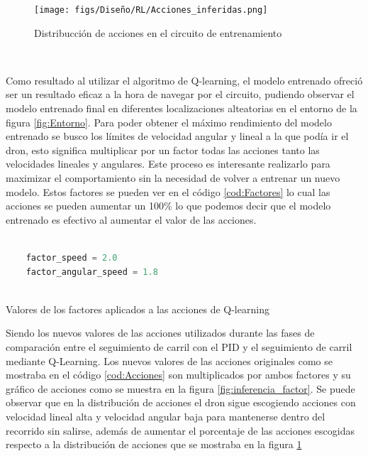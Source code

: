 \begin{figure} [H]
  \begin{center}
    \texttt{[image: figs/Diseño/RL/Acciones\_inferidas.png]}
  \end{center}
  \caption{Distribucción de acciones en el circuito de entrenamiento}
  \label{fig:Distribucción_inferencia}
\end{figure}\

Como resultado al utilizar el algoritmo de Q-learning, el modelo entrenado ofreció ser un resultado eficaz a la hora de navegar por el circuito, pudiendo observar 
el modelo entrenado final en diferentes localizaciones alteatorias en el entorno de la figura \ref{fig:Entorno}. Para poder obtener el máximo rendimiento del modelo entrenado se busco los límites de velocidad
angular y lineal a la que podía ir el dron, esto significa multiplicar por un factor todas las acciones tanto las velocidades lineales y angulares. Este proceso es interesante 
realizarlo para maximizar el comportamiento sin la necesidad de volver a entrenar un nuevo modelo. Estos factores se pueden ver en el código \ref{cod:Factores} lo cual 
las acciones se pueden aumentar un 100\% lo que podemos decir que el modelo entrenado es efectivo al aumentar el valor de las acciones. \newline

\begin{code}[h]
  \begin{lstlisting}[language=Python]

    factor_speed = 2.0
    factor_angular_speed = 1.8
   
  \end{lstlisting}
  \caption[Factores]{Valores de los factores aplicados a las acciones de Q-learning}
  \label{cod:Factores}
  \end{code} 

Siendo los nuevos valores de las acciones utilizados durante las fases de comparación entre el seguimiento de carril con el PID y el seguimiento de carril mediante Q-Learning. Los nuevos
valores de las acciones originales como se mostraba en el código \ref{cod:Acciones} son multiplicados por ambos factores
y su gráfico de acciones como se muestra en la figura \ref{fig:inferencia_factor}. Se puede observar que en la distribución de acciones el dron
sigue escogiendo acciones con velocidad lineal alta y velocidad angular baja para mantenerse dentro del recorrido sin salirse, además de aumentar el porcentaje de las acciones escogidas respecto a la distribución de acciones
que se mostraba en la figura \ref{fig:Distribucción_inferencia}

